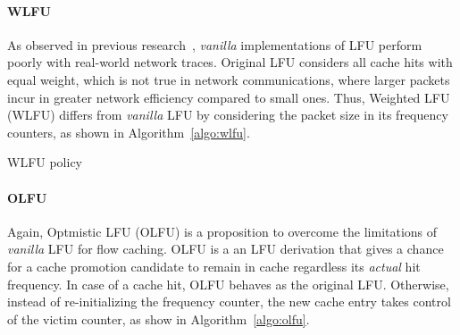 \paragraph{WLFU}
As observed in previous research~\cite{Kim:09}, \textit{vanilla} implementations of LFU perform poorly with real-world network traces.
Original LFU considers all cache hits with equal weight, which is not true in network communications, where larger packets incur in greater network efficiency compared to small ones.
Thus, Weighted LFU (WLFU) differs from \textit{vanilla} LFU by considering the packet size in its frequency counters, as shown in Algorithm~\ref{algo:wlfu}.

\begin{algorithm}[]
\caption{WLFU policy}
\label{algo:wlfu}
\SetInd{0.1em}{.9em}
\SetAlgoLined
\footnotesize
{}
%
%
%
%
%
\end{algorithm}

\paragraph{OLFU}
Again, Optmistic LFU (OLFU) is a proposition to overcome the limitations of \textit{vanilla} LFU for flow caching.
OLFU is a an LFU derivation that gives a chance for a cache promotion candidate to remain in cache regardless its \textit{actual} hit frequency.
In case of a cache hit, OLFU behaves as the original LFU.
Otherwise, instead of re-initializing the frequency counter, the new cache entry takes control of the victim counter, as show in Algorithm~\ref{algo:olfu}.


